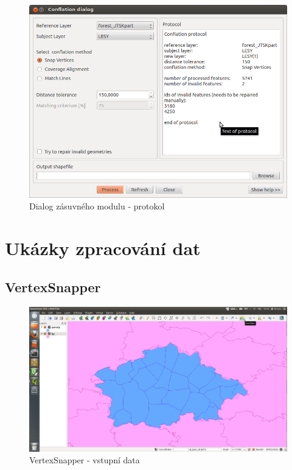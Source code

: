   \begin{figure}[H]
    \centering
      \includegraphics[width=360pt]{./pictures/dialog4.png}
      \caption{Dialog zásuvného modulu - protokol}
      \label{fig:d4}
  \end{figure} 

\chapter{Ukázky zpracování dat}
\label{priloha-ukazky}

\section{VertexSnapper}
\label{ukazky-vs}

  \begin{figure}[H]
    \centering
      \includegraphics[width=400pt]{./pictures/test-vs1.png}
      \caption{VertexSnapper - vstupní data}
      \label{fig:vs1}
  \end{figure}

